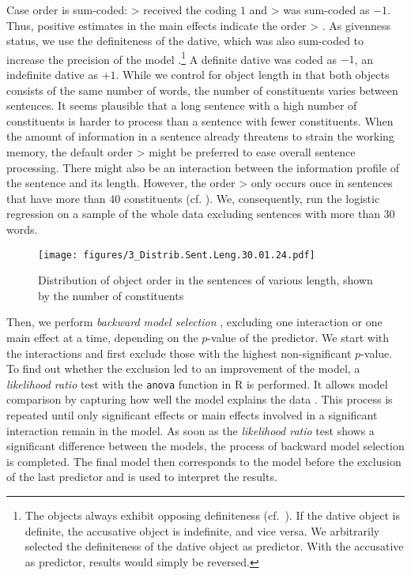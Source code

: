 \documentclass[output=paper,colorlinks,citecolor=brown]{langscibook}
\begin{document}
Case order is sum-coded: \ReichDat{} > \ReichAcc{} received the coding $1$ and \ReichAcc{} > \ReichDat{} was sum-coded as $-1$. Thus, positive estimates in the main effects indicate the order \ReichDat{} > \ReichAcc{}. As givenness status, we use the definiteness of the dative, which was also sum-coded to increase the precision of the model \citep{Gries.2021}.\footnote{The objects always exhibit opposing definiteness (cf.\ ). If the dative object is definite, the accusative object is indefinite, and vice versa. We arbitrarily selected the definiteness of the dative object as predictor. With the accusative as predictor, results would simply be reversed.}
A definite dative was coded as $-1$, an indefinite dative as $+1$.
While we control for object length in that both objects consists of the same number of words, the number of constituents varies between sentences.
It seems plausible that a long sentence with a high number of constituents is harder to process than a sentence with fewer constituents. When the amount of information in a sentence already threatens to strain the working memory, the default order \ReichDat{} > \ReichAcc{} might be preferred to ease overall sentence processing. There might also be an interaction between the information profile of the sentence and its length.  However, the order \ReichAcc{} > \ReichDat{} only occurs once in sentences that have more than 40 constituents (cf. ). We, consequently, run the logistic regression on a sample of the whole data excluding sentences with more than 30 words.

\begin{figure}
  \texttt{[image: figures/3\_Distrib.Sent.Leng.30.01.24.pdf]}
  \caption{Distribution of object order in the sentences of various length, shown by the number of constituents}
  \label{fig:object_order_sentence_length}
\end{figure}

Then, we perform \textit{backward model selection} \citep{Gries.2021},
excluding one interaction or one main effect at a time, depending on the $p$-value of the predictor.  
We start with the interactions and first exclude those with the highest non-significant $p$-value. 
To find out whether the exclusion led to an improvement of the model, a \textit{likelihood ratio} test with the \texttt{anova} function in R \citep{R} is performed. 
It allows model comparison by capturing how well the model explains the data \citep{Winter.2020}. This process is repeated until only significant effects or main effects involved in a significant interaction remain in the model. 
As soon as the \textit{likelihood ratio} test shows a significant difference between the models, the process of backward model selection is completed. The final model then corresponds to the model before the exclusion of the last predictor and is used to interpret the results.
\end{document}
